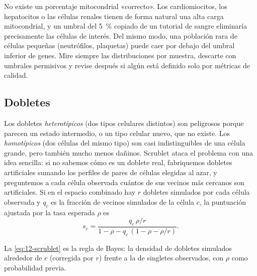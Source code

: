 \begin{cuidado}
No existe un porcentaje mitocondrial «correcto». Los cardiomiocitos, los hepatocitos o las células renales tienen de forma natural una alta carga mitocondrial, y un umbral del \SI{5}{\percent} copiado de un tutorial de sangre eliminaría precisamente las células de interés. Del mismo modo, una población rara de células pequeñas (neutrófilos, plaquetas) puede caer por debajo del umbral inferior de genes. Mire siempre las distribuciones por muestra, descarte con umbrales permisivos y revise después si algún  está definido solo por métricas de calidad.
\end{cuidado}

\subsection{Dobletes}

Los dobletes \emph{heterotípicos} (dos tipos celulares distintos) son peligrosos porque parecen un estado intermedio, o un tipo celular nuevo, que no existe. Los \emph{homotípicos} (dos células del mismo tipo) son casi indistinguibles de una célula grande, pero también mucho menos dañinos. Scrublet \parencite{c12-wolock2019} ataca el problema con una idea sencilla: si no sabemos cómo es un doblete real, fabriquemos dobletes artificiales sumando los perfiles de pares de células elegidas al azar, y preguntemos a cada célula observada cuántos de sus vecinos más cercanos son artificiales. Si en el espacio combinado hay $r$ dobletes simulados por cada célula observada y $q_c$ es la fracción de vecinos simulados de la célula $c$, la puntuación ajustada por la tasa esperada $\rho$ es
\begin{equation}\label{eq:12-scrublet}
s_c = \frac{q_c\,\rho/r}{1-\rho-q_c\,(1-\rho-\rho/r)}.
\end{equation}
\begin{simbolos}
\end{simbolos}
La \cref{eq:12-scrublet} es la regla de Bayes: la densidad de dobletes simulados alrededor de $c$ (corregida por $r$) frente a la de singletes observados, con $\rho$ como probabilidad previa.

